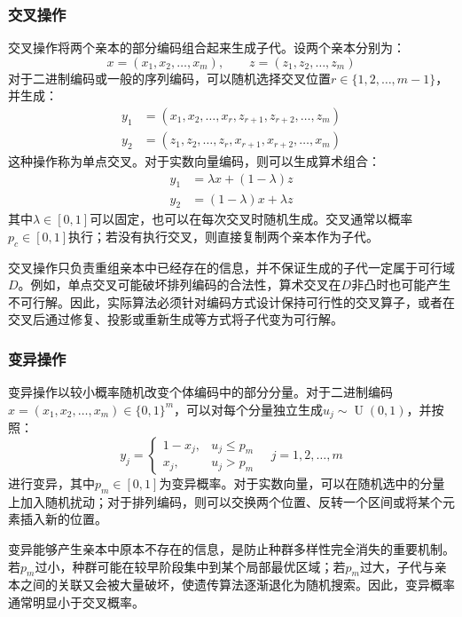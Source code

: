 \subsubsection{交叉操作}
交叉操作将两个亲本的部分编码组合起来生成子代。设两个亲本分别为：
\begin{equation*}
	x=(x_1,x_2,\dots,x_m),\qquad z=(z_1,z_2,\dots,z_m)
\end{equation*}
对于二进制编码或一般的序列编码，可以随机选择交叉位置$r\in\{1,2,\dots,m-1\}$，并生成：
\begin{align*}
	y_1&=(x_1,x_2,\dots,x_r,z_{r+1},z_{r+2},\dots,z_m) \\
	y_2&=(z_1,z_2,\dots,z_r,x_{r+1},x_{r+2},\dots,x_m)
\end{align*}
这种操作称为单点交叉。对于实数向量编码，则可以生成算术组合：
\begin{align*}
	y_1&=\lambda x+(1-\lambda)z \\
	y_2&=(1-\lambda)x+\lambda z
\end{align*}
其中$\lambda\in[0,1]$可以固定，也可以在每次交叉时随机生成。交叉通常以概率$p_c\in[0,1]$执行；若没有执行交叉，则直接复制两个亲本作为子代。\par
交叉操作只负责重组亲本中已经存在的信息，并不保证生成的子代一定属于可行域$D$。例如，单点交叉可能破坏排列编码的合法性，算术交叉在$D$非凸时也可能产生不可行解。因此，实际算法必须针对编码方式设计保持可行性的交叉算子，或者在交叉后通过修复、投影或重新生成等方式将子代变为可行解。
\subsubsection{变异操作}
变异操作以较小概率随机改变个体编码中的部分分量。对于二进制编码$x=(x_1,x_2,\dots,x_m)\in\{0,1\}^m$，可以对每个分量独立生成$u_j\sim\operatorname{U}(0,1)$，并按照：
\begin{equation*}
	y_j=
	\begin{cases}
		1-x_j,&u_j\leqslant p_m \\
		x_j,&u_j>p_m
	\end{cases}
	\quad j=1,2,\dots,m
\end{equation*}
进行变异，其中$p_m\in[0,1]$为变异概率。对于实数向量，可以在随机选中的分量上加入随机扰动；对于排列编码，则可以交换两个位置、反转一个区间或将某个元素插入新的位置。\par
变异能够产生亲本中原本不存在的信息，是防止种群多样性完全消失的重要机制。若$p_m$过小，种群可能在较早阶段集中到某个局部最优区域；若$p_m$过大，子代与亲本之间的关联又会被大量破坏，使遗传算法逐渐退化为随机搜索。因此，变异概率通常明显小于交叉概率。
